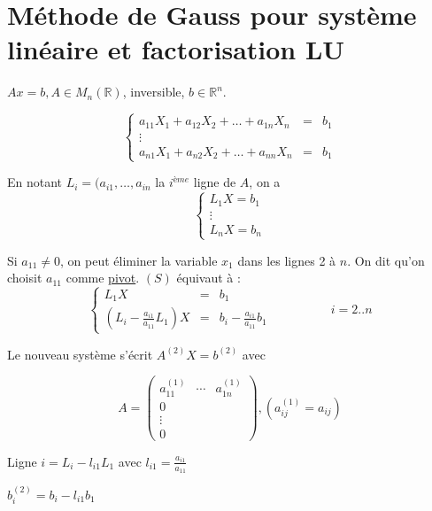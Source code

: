 \documentclass[a4paper,11pt]{article}
\newcommand{\R}{\mathbb{R}}
\theoremstyle{plain} %
\begin{document}
\section{Méthode de Gauss pour système linéaire et factorisation LU}

$Ax=b, A \in M_n(\R)$, inversible, $b \in \R^n$.

\begin{equation}
    \left\lbrace
    \begin{array}{ccc}
        a_{11}X_1 + a_{12}X_2+ \dots+ a_{1n}X_n & = & b_1 \\
        \vdots \\
        a_{n1}X_1 + a_{n2}X_2 + \dots + a_{nn}X_n & = & b_1
    \end{array}\right.
\end{equation}

En notant $L_i = (a_{i1}, \dots, a_{in}$ la $i^{ème}$ ligne de $A$, on a
\begin{equation}
    \left\lbrace
    \begin{array}{ccc}
        L_1 X = b_1 \\
        \vdots \\
        L_n X = b_n
    \end{array}\right.
    \tag{S}
    \label{eq:S}
\end{equation}

Si $a_{11} \neq 0$, on peut éliminer la variable $x_1$ dans les lignes 2 à $n$. On dit qu'on choisit $a_{11}$ comme \underline{pivot}.
$(S)$ équivaut à :
\[
    \left\lbrace
    \begin{array}{ccc}
        L_{1}X & = & b_1 \\
        (L_i - \frac{a_{i1}}{a_{11}}L_1) X & = & b_i - \frac{a_{i1}}{a_{11}}b_1 
    \end{array}\right.
    \hspace{2cm} i = 2..n
\]

Le nouveau système s'écrit $A^{(2)}X =b^{(2)}$ avec

\[
    A = 
    \begin{pmatrix}
        a_{11}^{(1)} & \cdots & a_{1n}^{(1)} \\
        0 \\
        \vdots \\
        0
    \end{pmatrix} 
    ,
    (a_{ij}^{(1)} = a_{ij})
\]

Ligne $i = L_i - l_{i1}L_1$ avec $l_{i1} = \frac{a_{i1}}{a_{11}}$

$b_i^{(2)} =  b_i - l_{i1}b_1$
\end{document}
